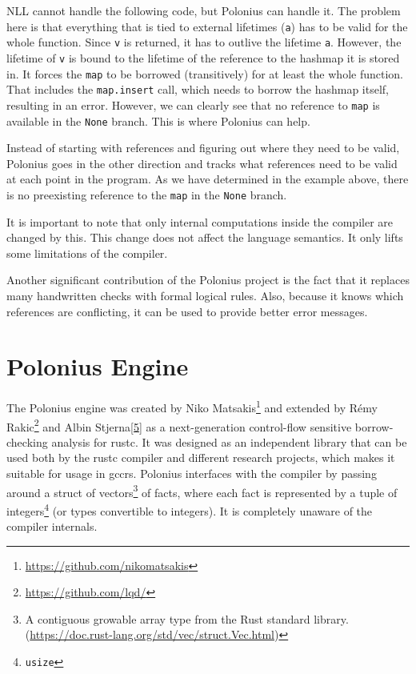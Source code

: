 \documentclass[
  11pt,
  twoside,symmetric]{report}
\DeclareRobustCommand{\href}[2]{#2\footnote{\url{#1}}}
\begin{document}
NLL cannot handle the following code, but Polonius can handle it. The
problem here is that everything that is tied to external lifetimes
(\texttt{\textquotesingle{}a}) has to be valid for the whole function.
Since \texttt{v} is returned, it has to outlive the lifetime
\texttt{\textquotesingle{}a}. However, the lifetime of \texttt{v} is
bound to the lifetime of the reference to the hashmap it is stored in.
It forces the \texttt{map} to be borrowed (transitively) for at least
the whole function. That includes the \texttt{map.insert} call, which
needs to borrow the hashmap itself, resulting in an error. However, we
can clearly see that no reference to \texttt{map} is available in the
\texttt{None} branch. This is where Polonius can help.

Instead of starting with references and figuring out where they need to
be valid, Polonius goes in the other direction and tracks what
references need to be valid at each point in the program. As we have
determined in the example above, there is no preexisting reference to
the \texttt{map} in the \texttt{None} branch.

It is important to note that only internal computations inside the
compiler are changed by this. This change does not affect the language
semantics. It only lifts some limitations of the compiler.

Another significant contribution of the Polonius project is the fact
that it replaces many handwritten checks with formal logical rules.
Also, because it knows which references are conflicting, it can be used
to provide better error messages.

\hypertarget{polonius-engine}{%
\chapter{Polonius Engine}\label{polonius-engine}}

The Polonius engine was created by
\href{https://github.com/nikomatsakis}{Niko Matsakis} and extended by
\href{https://github.com/lqd/}{Rémy Rakic} and Albin
Stjerna\protect\hyperlink{ref-Stjerna2020}{{[}5{]}} as a next-generation
control-flow sensitive borrow-checking analysis for rustc. It was
designed as an independent library that can be used both by the rustc
compiler and different research projects, which makes it suitable for
usage in gccrs. Polonius interfaces with the compiler by passing around
a struct of vectors\footnote{A contiguous growable array type from the
  Rust standard library.
  (\url{https://doc.rust-lang.org/std/vec/struct.Vec.html})} of facts,
where each fact is represented by a tuple of integers\footnote{\texttt{usize}}
(or types convertible to integers). It is completely unaware of the
compiler internals.
\end{document}
